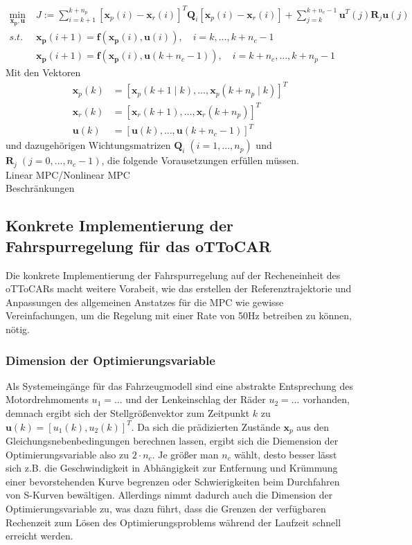 \begin{align*}
	\underset{\boldsymbol{x_p, u}}{\text{min}}\;&J:=\sum_{i=k+1}^{k+n_p} \left [\boldsymbol{x}_{p}(i)-\boldsymbol{x}_{r}(i)\right ]^T\boldsymbol{Q}_i\left [\boldsymbol{x}_{p}(i)-\boldsymbol{x}_{r}(i)\right ] +\sum_{j=k}^{k+n_c-1} \boldsymbol{u}^T(j)\boldsymbol{R}_j\boldsymbol{u}(j)\\
	s.t.\;&\boldsymbol{x_p}(i+1)=\boldsymbol{f}\left ( \boldsymbol{x_p}(i), \boldsymbol{u}(i) \right ),\quad i=k,...,k+n_c-1\\
	&\boldsymbol{x_p}(i+1)=\boldsymbol{f}\left ( \boldsymbol{x_p}(i), \boldsymbol{u}(k+n_c-1) \right ),\quad i=k+n_c,...,k+n_p-1
\end{align*}
Mit den Vektoren
\begin{align*}
	\boldsymbol{x}_p(k)&=\left [ \boldsymbol{x}_p(k+1\mid k),\dots,\boldsymbol{x}_p(k+n_p\mid k) \right ]^T\\
	\boldsymbol{x}_r(k)&=\left [ \boldsymbol{x}_r(k+1),\dots,\boldsymbol{x}_r(k+n_p) \right ]^T\\
	\boldsymbol{u}(k)&=\left [ \boldsymbol{u}(k),\dots,\boldsymbol{u}(k+n_c-1) \right ]^T
\end{align*}
und dazugehörigen Wichtungsmatrizen $\boldsymbol{Q}_i\;(i=1, ...,n_p)$ und $\boldsymbol{R}_j\;(j=0, ...,n_c-1)$, die folgende Vorausetzungen erfüllen müssen.\\
Linear MPC/Nonlinear MPC\\
Beschränkungen
\subsection{Konkrete Implementierung der Fahrspurregelung für das oTToCAR}
Die konkrete Implementierung der Fahrspurregelung auf der Recheneinheit des oTToCARs macht weitere Vorabeit, wie das erstellen der Referenztrajektorie und Anpassungen des allgemeinen Anstatzes für die MPC wie gewisse Vereinfachungen, um die Regelung mit einer Rate von 50Hz betreiben zu können, nötig.
\subsubsection{Dimension der Optimierungsvariable}
Als Systemeingänge für das Fahrzeugmodell sind eine abstrakte Entsprechung des Motordrehmoments $u_1=...$ und der Lenkeinschlag der Räder $u_2=...$ vorhanden, demnach ergibt sich der Stellgrößenvektor zum Zeitpunkt $k$ zu $\boldsymbol{u}(k)=[u_1(k), u_2(k)]^T$. Da sich die prädizierten Zustände $\boldsymbol{x}_p$ aus den Gleichungsnebenbedingungen berechnen lassen, ergibt sich die Diemension der Optimierungsvariable also zu $2\cdot n_c$.
Je größer man $n_c$ wählt, desto besser lässt sich z.B. die Geschwindigkeit in Abhängigkeit zur Entfernung und Krümmung einer bevorstehenden Kurve begrenzen oder Schwierigkeiten beim Durchfahren von S-Kurven bewältigen. Allerdings nimmt dadurch auch die Dimension der Optimierungsvariable zu, was dazu führt, dass die Grenzen der verfügbaren Rechenzeit zum Lösen des Optimierungsproblems während der Laufzeit schnell erreicht werden.
